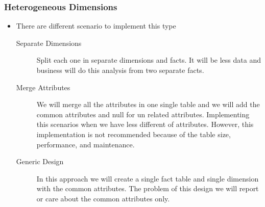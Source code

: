\begin{frame}
	\frametitle{Heterogeneous Dimensions}
	\begin{itemize}[<+->]		
		\item There are different scenario to implement this type
		\begin{description}
			\item [Separate Dimensions] Split each one in separate dimensions and facts. It will be less data and business will do this analysis from two separate facts.
			\item [Merge Attributes] We will merge all the attributes in one single table and we will add the common attributes and null for un related attributes. Implementing this scenarios when we have less different of attributes. However, this implementation is not recommended because of the table size, performance, and maintenance.
			\item [Generic Design] In this approach we will create a single fact table and single dimension with the common attributes. The problem of this design we will report or care about the common attributes only.
		\end{description}		
\end{itemize}
\end{frame}


